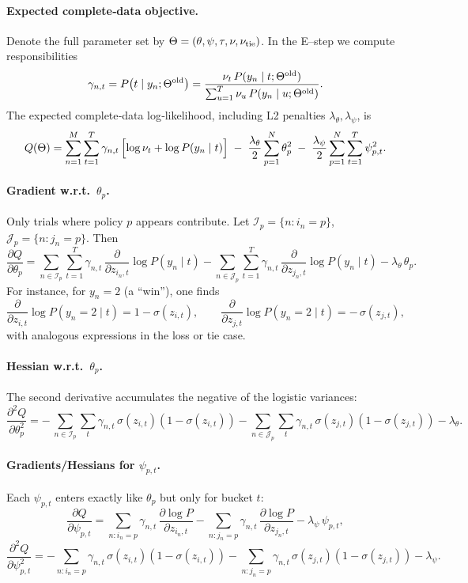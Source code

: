 \paragraph{Expected complete‐data objective.}  
Denote the full parameter set by \(\Theta=(\theta,\psi,\tau,\nu,\nu_{\rm tie})\).  In the E–step we compute responsibilities
\[
  \gamma_{n,t}
  = P\bigl(t\mid y_n;\Theta^{\rm old}\bigr)
  = \frac{\nu_t\,P(y_n\mid t;\Theta^{\rm old})}
         {\sum_{u=1}^T \nu_u\,P(y_n\mid u;\Theta^{\rm old})}.
\]
The expected complete‐data log‐likelihood, including L2 penalties \(\lambda_\theta,\lambda_\psi\), is
\[
  Q(\Theta)
  = \sum_{n=1}^M\sum_{t=1}^T
      \gamma_{n,t}\,\Bigl[\log\nu_t + \log P(y_n\mid t)\Bigr]
    \;-\;\frac{\lambda_\theta}{2}\sum_{p=1}^N \theta_p^2
    \;-\;\frac{\lambda_\psi}{2}\sum_{p=1}^N\sum_{t=1}^T \psi_{p,t}^2.
\]

\paragraph{Gradient w.r.t.\ \(\theta_p\).}  
Only trials where policy \(p\) appears contribute.  Let
\(\mathcal{I}_p=\{n:i_n=p\}\), \(\mathcal{J}_p=\{n:j_n=p\}\).  Then
\[
  \frac{\partial Q}{\partial\theta_p}
  = \sum_{n\in\mathcal{I}_p}\sum_{t=1}^T
      \gamma_{n,t}\,\frac{\partial}{\partial z_{i_n,t}}
      \log P(y_n\mid t)
  - \sum_{n\in\mathcal{J}_p}\sum_{t=1}^T
      \gamma_{n,t}\,\frac{\partial}{\partial z_{j_n,t}}
      \log P(y_n\mid t)
  - \lambda_\theta\,\theta_p.
\]
For instance, for \(y_n=2\) (a “win”), one finds
\[
  \frac{\partial}{\partial z_{i,t}}\log P(y_n=2\mid t)
    = 1 - \sigma(z_{i,t}),
  \qquad
  \frac{\partial}{\partial z_{j,t}}\log P(y_n=2\mid t)
    = -\,\sigma(z_{j,t}),
\]
with analogous expressions in the loss or tie case.

\paragraph{Hessian w.r.t.\ \(\theta_p\).}  
The second derivative accumulates the negative of the logistic variances:
\[
  \frac{\partial^2 Q}{\partial\theta_p^2}
  = -\,\sum_{n\in\mathcal{I}_p}\sum_t
      \gamma_{n,t}\,\sigma(z_{i,t})(1-\sigma(z_{i,t}))
    -\sum_{n\in\mathcal{J}_p}\sum_t
      \gamma_{n,t}\,\sigma(z_{j,t})(1-\sigma(z_{j,t}))
    - \lambda_\theta.
\]

\paragraph{Gradients/Hessians for \(\psi_{p,t}\).}  
Each \(\psi_{p,t}\) enters exactly like \(\theta_p\) but only for bucket \(t\):
\[
  \frac{\partial Q}{\partial\psi_{p,t}}
  = \sum_{n:i_n=p}\gamma_{n,t}\,\frac{\partial\log P}{\partial z_{i_n,t}}
  - \sum_{n:j_n=p}\gamma_{n,t}\,\frac{\partial\log P}{\partial z_{j_n,t}}
  - \lambda_\psi\,\psi_{p,t},
\]
\[
  \frac{\partial^2Q}{\partial\psi_{p,t}^2}
  = -\sum_{n:i_n=p}\gamma_{n,t}\,\sigma(z_{i,t})(1-\sigma(z_{i,t}))
    -\sum_{n:j_n=p}\gamma_{n,t}\,\sigma(z_{j,t})(1-\sigma(z_{j,t}))
    - \lambda_\psi.
\]

